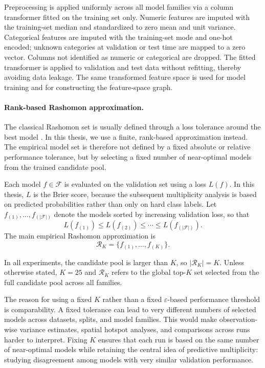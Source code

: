 Preprocessing is applied uniformly across all model families via a column transformer
\label{sec:exp-preproc}
fitted on the training set only. Numeric features are imputed with the training-set median
and standardized to zero mean and unit variance. Categorical features are imputed with
the training-set mode and one-hot encoded; unknown categories at validation or test time
are mapped to a zero vector. Columns not identified as numeric or categorical are
dropped. The fitted transformer is applied to validation and test data without refitting,
thereby avoiding data leakage. The same transformed feature space is used for model
training and for constructing the feature-space graph.

\paragraph{Rank-based Rashomon approximation.}
\label{sec:meth-rashomon}
\label{sec:exp-rashomon}
The classical Rashomon set is usually defined through a loss tolerance around the best
model \citep{breiman_statistical_2001, marx_predictive_2020,
semenova_existence_2022}. In this thesis, we use a finite, rank-based approximation
instead. The empirical model set is therefore not defined by a fixed absolute or relative
performance tolerance, but by selecting a fixed number of near-optimal models from the
trained candidate pool.

Each model $f \in \mathcal{F}$ is evaluated on the validation set using a loss $L(f)$. In
this thesis, $L$ is the Brier score, because the subsequent multiplicity analysis is based
on predicted probabilities rather than only on hard class labels. Let
$f_{(1)},\ldots,f_{(|\mathcal{F}|)}$ denote the models sorted by increasing validation loss,
so that
\[
L(f_{(1)}) \leq L(f_{(2)}) \leq \cdots \leq L(f_{(|\mathcal{F}|)}).
\]
The main empirical Rashomon approximation is
\[
\mathcal{R}_K = \{f_{(1)},\ldots,f_{(K)}\}.
\]

In all experiments, the candidate pool is larger than \(K\), so \(|\mathcal{R}_K|=K\).
Unless otherwise stated, $K=25$ and $\mathcal{R}_K$ refers to the global top-$K$ set
selected from the full candidate pool across all families.

The reason for using a fixed $K$ rather than a fixed $\varepsilon$-based performance
threshold is comparability. A fixed tolerance can lead to very different numbers of
selected models across datasets, splits, and model families. This would make
observation-wise variance estimates, spatial hotspot analyses, and comparisons across
runs harder to interpret. Fixing $K$ ensures that each run is based on the same number of
near-optimal models while retaining the central idea of predictive multiplicity: studying
disagreement among models with very similar validation performance.

